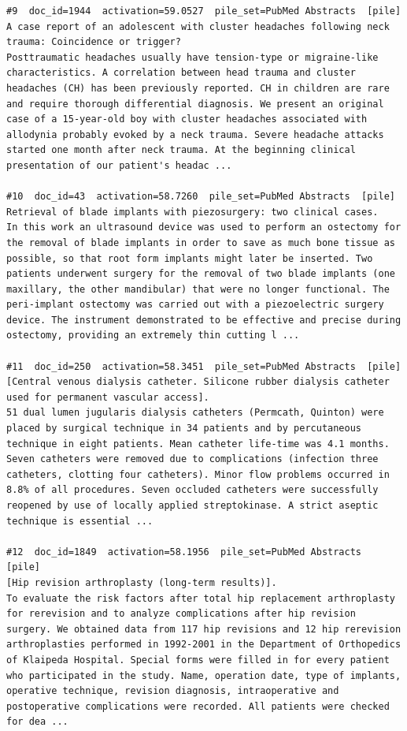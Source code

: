 \begin{verbatim}
#9  doc_id=1944  activation=59.0527  pile_set=PubMed Abstracts  [pile]
A case report of an adolescent with cluster headaches following neck trauma: Coincidence or trigger?
Posttraumatic headaches usually have tension-type or migraine-like characteristics. A correlation between head trauma and cluster headaches (CH) has been previously reported. CH in children are rare and require thorough differential diagnosis. We present an original case of a 15-year-old boy with cluster headaches associated with allodynia probably evoked by a neck trauma. Severe headache attacks started one month after neck trauma. At the beginning clinical presentation of our patient's headac ...

#10  doc_id=43  activation=58.7260  pile_set=PubMed Abstracts  [pile]
Retrieval of blade implants with piezosurgery: two clinical cases.
In this work an ultrasound device was used to perform an ostectomy for the removal of blade implants in order to save as much bone tissue as possible, so that root form implants might later be inserted. Two patients underwent surgery for the removal of two blade implants (one maxillary, the other mandibular) that were no longer functional. The peri-implant ostectomy was carried out with a piezoelectric surgery device. The instrument demonstrated to be effective and precise during ostectomy, providing an extremely thin cutting l ...

#11  doc_id=250  activation=58.3451  pile_set=PubMed Abstracts  [pile]
[Central venous dialysis catheter. Silicone rubber dialysis catheter used for permanent vascular access].
51 dual lumen jugularis dialysis catheters (Permcath, Quinton) were placed by surgical technique in 34 patients and by percutaneous technique in eight patients. Mean catheter life-time was 4.1 months. Seven catheters were removed due to complications (infection three catheters, clotting four catheters). Minor flow problems occurred in 8.8% of all procedures. Seven occluded catheters were successfully reopened by use of locally applied streptokinase. A strict aseptic technique is essential ...

#12  doc_id=1849  activation=58.1956  pile_set=PubMed Abstracts  [pile]
[Hip revision arthroplasty (long-term results)].
To evaluate the risk factors after total hip replacement arthroplasty for rerevision and to analyze complications after hip revision surgery. We obtained data from 117 hip revisions and 12 hip rerevision arthroplasties performed in 1992-2001 in the Department of Orthopedics of Klaipeda Hospital. Special forms were filled in for every patient who participated in the study. Name, operation date, type of implants, operative technique, revision diagnosis, intraoperative and postoperative complications were recorded. All patients were checked for dea ...


\end{verbatim}
